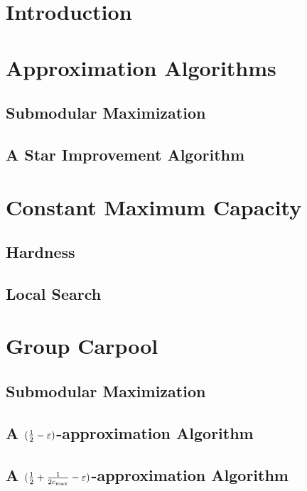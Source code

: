 \begin{abstract}

\end{abstract}

\section{Introduction}


\section{Approximation Algorithms}
\label{sec:approx}


\subsection{Submodular Maximization}
\label{sec:sub}


   \subsection{A Star Improvement Algorithm}
   \label{sec:improve}
   

\section{Constant Maximum Capacity}
\label{sec:cmax}


   \subsection{Hardness}
   \label{sec:hardness}
   

   \subsection{Local Search}
   \label{sec:local}
   

\section{Group Carpool}
\label{sec:group}


   \subsection{Submodular Maximization}
   

   \subsection{A \texorpdfstring{$(\frac{1}{2} - \varepsilon)$}--approximation
	Algorithm}
   

   \subsection{A \texorpdfstring{$(\frac{1}{2} + \frac{1}{2c_{\max}} - \varepsilon)$}--approximation
	Algorithm}
   
